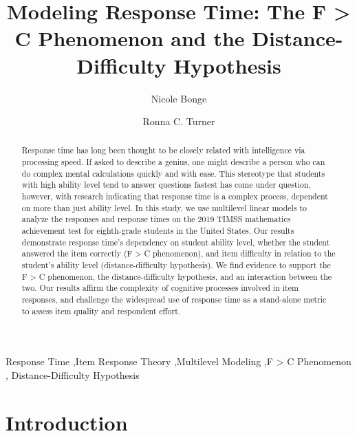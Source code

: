 \documentclass[
  number]{elsarticle}
\begin{document}
\begin{frontmatter}
\title{Modeling Response Time: The F \textgreater{} C Phenomenon and the
Distance-Difficulty Hypothesis}
\author[1]{Nicole Bonge%
%
}
\author[1]{Ronna C. Turner%
%
}




        
\begin{abstract}
Response time has long been thought to be closely related with
intelligence via processing speed. If asked to describe a genius, one
might describe a person who can do complex mental calculations quickly
and with ease. This stereotype that students with high ability level
tend to answer questions fastest has come under question, however, with
research indicating that response time is a complex process, dependent
on more than just ability level. In this study, we use multilevel linear
models to analyze the responses and response times on the 2019 TIMSS
mathematics achievement test for eighth-grade students in the United
States. Our results demonstrate response time's dependency on student
ability level, whether the student answered the item correctly (F
\textgreater{} C phenomenon), and item difficulty in relation to the
student's ability level (distance-difficulty hypothesis). We find
evidence to support the F \textgreater{} C phenomenon, the
distance-difficulty hypothesis, and an interaction between the two. Our
results affirm the complexity of cognitive processes involved in item
responses, and challenge the widespread use of response time as a
stand-alone metric to assess item quality and respondent effort.
\end{abstract}





\begin{keyword}
    Response Time \sep Item Response Theory \sep Multilevel
Modeling \sep F \textgreater{} C Phenomenon \sep 
    Distance-Difficulty Hypothesis
\end{keyword}
\end{frontmatter}
    

\section{Introduction}\label{introduction}
\end{document}

